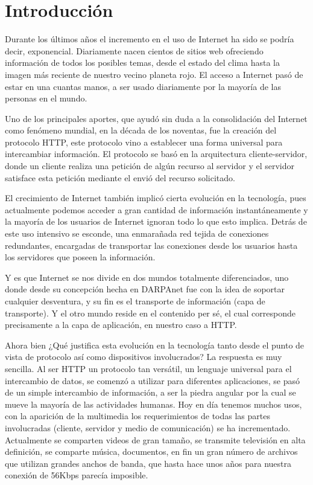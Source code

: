 
\chapter{Introducción} %

\label{ch:introduction} %

Durante los últimos años el incremento en el uso de Internet ha sido se podría decir, exponencial. Diariamente nacen cientos de sitios web ofreciendo información de todos los posibles temas, desde el estado del clima hasta la imagen más reciente de nuestro vecino planeta rojo. El acceso a Internet pasó de estar en una cuantas manos, a ser usado diariamente por la mayoría de las personas en el mundo.

Uno de los principales aportes, que ayudó sin duda a la consolidación del Internet como fenómeno mundial, en la década de los noventas, fue la creación del protocolo HTTP, este protocolo vino a establecer una forma universal para intercambiar información. El protocolo se basó en la arquitectura cliente-servidor, donde un cliente realiza una petición de algún recurso al servidor y el servidor satisface esta petición mediante el envió del recurso solicitado.

El crecimiento de Internet también implicó cierta evolución en la tecnología, pues actualmente podemos acceder a gran cantidad de información instantáneamente y la mayoría de los usuarios de Internet ignoran todo lo que esto implica. Detrás de este uso intensivo se esconde, una enmarañada red tejida de conexiones redundantes, encargadas de transportar las conexiones desde los usuarios hasta los servidores que poseen la información. 

Y es que Internet se nos divide en dos mundos totalmente diferenciados, uno donde desde su concepción hecha en DARPAnet fue con la idea de soportar cualquier desventura, y su fin es el transporte de información (capa de transporte). Y el otro mundo reside en el contenido per sé, el cual corresponde precisamente a la capa de aplicación, en nuestro caso a HTTP. 

Ahora bien ¿Qué justifica esta evolución en la tecnología tanto desde el punto de vista de protocolo así como dispositivos involucrados? La respuesta es muy sencilla. Al ser HTTP un protocolo tan versátil, un lenguaje universal para el intercambio de datos, se comenzó a utilizar para diferentes aplicaciones, se pasó de un simple intercambio de información, a ser la piedra angular por la cual se mueve la mayoría de las actividades humanas. Hoy en día tenemos muchos usos, con la aparición de la multimedia los requerimientos de todas las partes involucradas (cliente, servidor y medio de comunicación) se ha incrementado. Actualmente se comparten videos de gran tamaño, se transmite televisión en alta definición, se comparte música, documentos, en fin un gran número de archivos que utilizan grandes anchos de banda, que hasta hace unos años para nuestra conexión de 56Kbps parecía imposible.

